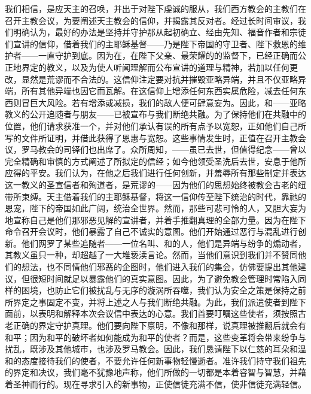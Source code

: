 我们相信，是应天主的召唤，并出于对陛下虔诚的服从，我们西方教会的主教们在召开主教会议，为要阐述天主教会的信仰，并揭露其反对者。经过长时间审议，我们明确认为，最好的办法是坚持并守护那从起初确立、经由先知、福音作者和宗徒们宣讲的信仰，借着我们的主耶稣基督——乃是陛下帝国的守卫者、陛下救恩的维护者——一直守护到底。因为在，在陛下父亲、最荣耀的的监督下，已经正确而公正地界定的教义，以及为使人听闻理解而公布宣讲的道理与精神，若加以任何更改，显然是荒谬而不合法的。这信仰注定要对抗并摧毁亚略异端，并且不仅亚略异端，所有其他异端也因它而瓦解。在这信仰上增添任何东西实属危险，减去任何东西则冒巨大风险。若有增添或减损，我们的敌人便可肆意妄为。因此，和——亚略教义的公开追随者与朋友——已被宣布与我们断绝共融。为了保持他们在共融中的位置，他们请求获准一个，并对他们承认有误的所有点予以宽恕，正如他们自己所写的文件所证明，并借此获得了恩惠与宽恕。这些事情发生时，正值在召开主教会议，罗马教会的司铎们也出席了。众所周知，——虽已去世，但值得纪念——曾以完全精确和审慎的方式阐述了所拟定的信经；如今他领受圣洗后去世，安息于他所应得的平安。我们认为，在他之后我们进行任何创新，并羞辱所有那些制定并表达这一教义的圣宣信者和殉道者，是荒谬的——因为他们的思想始终被教会古老的纽带所束缚。天主借着我们的主耶稣基督，将这一信仰传至陛下统治的时代，靠祂的恩宠，陛下的帝国如此广阔，统治全世界。然而，那些可悲可怜的人，又胆大妄为地宣称自己是他们那邪恶见解的宣讲者，并着手推翻真理的全部力量。因为在陛下命令召开会议时，他们暴露了自己不诚实的意图。他们开始通过恶行与混乱进行创新。他们网罗了某些追随者——一位名叫、和的人，他们是异端与纷争的煽动者，其教义虽只一种，却超越了一大堆亵渎言论。然而，当他们意识到我们并不赞同他们的想法，也不同情他们邪恶的企图时，他们进入我们的集会，仿佛要提出其他建议，但很短时间就足以暴露他们的真实意图。因此，为了避免教会管理时常陷入同样的困境，也防止它们被扰乱与无序的漩涡所吞噬，我们认为安全之策是保持之前所界定之事固定不变，并将上述之人与我们断绝共融。为此，我们派遣使者到陛下面前，以表明和解释本次会议信中表达的心意。我们首要叮嘱这些使者，须按照古老正确的界定守护真理。他们要向陛下禀明，不像和那样，说真理被推翻后就会有和平；因为和平的破坏者如何能成为和平的使者？而是，这些变革将会带来纷争与扰乱，既涉及其他城市，也涉及罗马教会。因此，我们恳请陛下以仁慈的耳朵和温和的态度接待我们的使者，不要允许任何新事物轻慢逝者。准许我们持守我们祖先的界定和决议，我们毫不犹豫地声称，他们所做的一切都是本着睿智与智慧，并藉着圣神而行的。现在寻求引入的新事物，正使信徒充满不信，使非信徒充满轻信。\par

